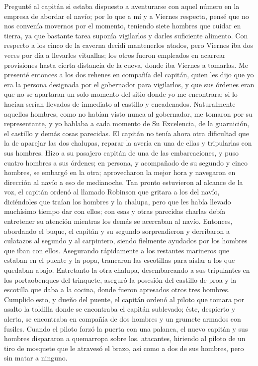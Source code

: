 \documentclass{novela}
\begin{document}
    Pregunté al capitán si estaba dispuesto a aventurarse con aquel número en la empresa de abordar el navío; por lo que a mí y a Viernes respecta, pensé que no nos convenía movernos por el momento, teniendo siete hombres que cuidar en tierra, ya que bastante tarea suponía vigilarlos y darles suficiente alimento. Con respecto a los cinco de la caverna decidí mantenerlos atados, pero Viernes iba dos veces por día a llevarles vituallas; los otros fueron empleados en acarrear provisiones hasta cierta distancia de la cueva, donde iba Viernes a tomarlas.
    Me presenté entonces a los dos rehenes en compañía del capitán, quien les dijo que yo era la persona designada por el gobernador para vigilarlos, y que sus órdenes eran que no se apartaran un solo momento del sitio donde yo me encontrara; si lo hacían serían llevados de inmediato al castillo y encadenados. Naturalmente aquellos hombres, como no habían visto nunca al gobernador, me tomaron por su representante, y yo hablaba a cada momento de Su Excelencia, de la guarnición, el castillo y demás cosas parecidas. El capitán no tenía ahora otra dificultad que la de aparejar las dos chalupas, reparar la avería en una de ellas y tripularlas con sus hombres. Hizo a su pasajero capitán de una de las embarcaciones, y puso cuatro hombres a sus órdenes; en persona, y acompañado de su segundo y cinco hombres, se embargó en la otra; aprovecharon la mejor hora y navegaron en dirección al navío a eso de medianoche. Tan pronto estuvieron al alcance de la voz, el capitán ordenó al llamado Robinson que gritara a los del navío, diciéndoles que traían los hombres y la chalupa, pero que les había llevado muchísimo tiempo dar con ellos; con esas y otras   parecidas  charlas  debía  entretener   su  atención mientras los demás se acercaban al navío.
    Entonces, abordando el buque, el capitán y su segundo sorprendieron y derribaron a culatazos al segundo y al carpintero, siendo fielmente ayudados por los hombres que iban con ellos. Asegurando rápidamente a los restantes marineros que estaban en el puente y la popa, trancaron las escotillas para aislar a los que quedaban abajo. Entretanto la otra chalupa, desembarcando a sus tripulantes en los portaobenques del trinquete, aseguró la posesión del castillo de proa y la escotilla que daba a la cocina, donde fueron apresados otros tres hombres.
    Cumplido esto, y dueño del puente, el capitán ordenó al piloto que tomara por asalto la toldilla donde se encontraba el capitán sublevado; éste, despierto y alerta, se encontraba en compañía de dos hombres y un grumete armados con fusiles. Cuando el piloto forzó la puerta con una palanca, el nuevo capitán y sus hombres dispararon a quemarropa sobre los. atacantes, hiriendo al piloto de un tiro de mosquete que le atravesó el brazo, así como a dos de sus hombres, pero sin matar a ninguno.
\end{document}
